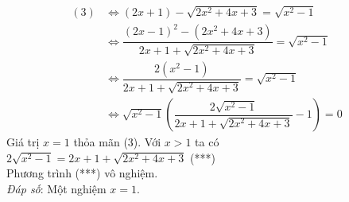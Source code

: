 \begin{bt}
{\begin{enumerate}[a)]
		\begin{align*}
		(3)&\Leftrightarrow (2x+1)-\sqrt{2x^2+4x+3}=\sqrt{x^2-1}\\
		&\Leftrightarrow \dfrac{(2x-1)^2-(2x^2+4x+3)}{2x+1+\sqrt{2x^2+4x+3}}=\sqrt{x^2-1}\\
		&\Leftrightarrow \dfrac{2(x^2-1)}{2x+1+\sqrt{2x^2+4x+3}}=\sqrt{x^2-1}\\
		&\Leftrightarrow \sqrt{x^2-1}\left(\dfrac{2\sqrt{x^2-1}}{2x+1+\sqrt{2x^2+4x+3}}-1\right)=0
		\end{align*}
		Giá trị $x=1$ thỏa mãn (3). Với $x>1$ ta có\\
		$2\sqrt{x^2-1}=2x+1+\sqrt{2x^2+4x+3}$ \hfill (***)\\
		Phương trình (***) vô nghiệm.\\
		\textit{Đáp số}: Một nghiệm $x=1$.
	\end{enumerate}
}
\end{bt}


